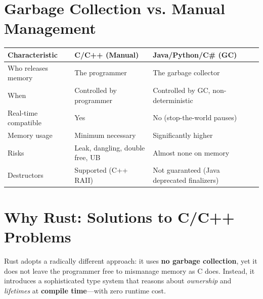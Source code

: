 \section{Garbage Collection vs. Manual Management}

\begin{center}
\begin{tabular}{|l|p{5.5cm}|p{5.5cm}|}
\hline
\textbf{Characteristic} & \textbf{C/C++ (Manual)} & \textbf{Java/Python/C\# (GC)} \\
\hline
Who releases memory & The programmer & The garbage collector \\
\hline
When & Controlled by programmer & Controlled by GC, non-deterministic \\
\hline
Real-time compatible & Yes & No (stop-the-world pauses) \\
\hline
Memory usage & Minimum necessary & Significantly higher \\
\hline
Risks & Leak, dangling, double free, UB & Almost none on memory \\
\hline
Destructors & Supported (C++ RAII) & Not guaranteed (Java deprecated finalizers) \\
\hline
\end{tabular}
\end{center}

\section{Why Rust: Solutions to C/C++ Problems}

Rust adopts a radically different approach: it uses \textbf{no garbage collection}, yet it does not leave the programmer free to mismanage memory as C does. Instead, it introduces a sophisticated type system that reasons about \emph{ownership} and \emph{lifetimes} at \textbf{compile time}---with zero runtime cost.

